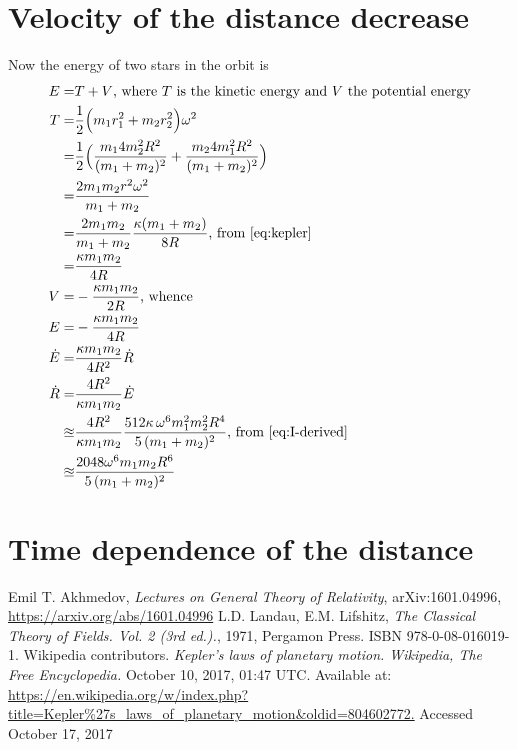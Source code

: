 \documentclass[]{article}
\begin{document}
\section{Velocity of the distance decrease}
Now the energy of two stars in the orbit is 
\begin{align*}
E=& T + V\text{, where $T$ is the kinetic energy and $V$ the potential energy}\\
T=&\frac{1}{2}\Big(m_1r_1^2+m_2r_2^2\Big) \omega^2\\
=& \frac{1}{2}\Big(\frac{m_1 4m_2^2R^2}{(m_1+m_2)^2}+\frac{m_2 4m_1^2R^2}{(m_1+m_2)^2}\Big)\\
=&\frac{2 m_1 m_2 r^2 \omega^2}{m_1 + m_2}\\
=& \frac{2 m_1 m_2}{m_1 + m_2} \frac{\kappa (m_1 + m_2)}{8 R}\text{, from \eqref{eq:kepler}}\\
=& \frac{\kappa m_1 m_2}{4R} \\
V=& - \frac{\kappa m_1 m_2}{2 R} \text{, whence}\\
E=&-\frac{\kappa m_1 m_2}{4R} \\
\dot{E} =& \frac{\kappa m_1 m_2}{4R^2}\dot{R}\\
\dot{R}=& \frac{4 R^2}{\kappa m_1 m_2} \dot{E} \\
\approxeq& \frac{4 R^2}{\kappa m_1 m_2} \frac{512\kappa\, \omega^6 m_1^2 m_2^2 R^4}{5\,(m_1 + m_2)^2} \text{, from \eqref{eq:I-derived}}\\
\approxeq&  \frac{2048 \omega^6 m_1 m_2 R^6}{5\,(m_1 + m_2)^2}
\end{align*}
\section{Time dependence of the distance}


\begin{thebibliography}{9}
	Emil T. Akhmedov,
	\emph{Lectures on General Theory of Relativity},
 	arXiv:1601.04996,
 	\url{https://arxiv.org/abs/1601.04996}
 	L.D. Landau, E.M. Lifshitz,
 	\emph{The Classical Theory of Fields. Vol. 2 (3rd ed.).},
 	1971,
 	Pergamon Press.
 	ISBN 978-0-08-016019-1.
 	Wikipedia contributors.
 	\emph{Kepler's laws of planetary motion. Wikipedia, The Free Encyclopedia.}  October 10, 2017, 01:47 UTC. Available at: 
 	\url{https://en.wikipedia.org/w/index.php?title=Kepler%27s_laws_of_planetary_motion&oldid=804602772.} Accessed
 	October 17, 2017
\end{thebibliography}
\end{document}
